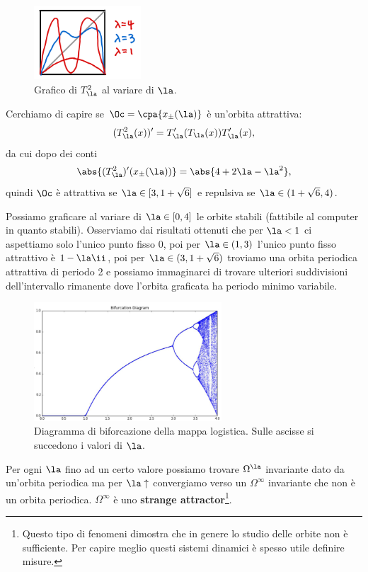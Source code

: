 \begin{figure}[!htb]
    \centering
    \includegraphics[width=4cm]{Immagini/Seconda_iterata_Logistica.png}
    \caption{Grafico di $T^2_\la$ al variare di $\la$.}
    \label{LogisticaIterata}
\end{figure}

\noindent
Cerchiamo di capire se $\Oc=\cpa{x_{\pm}(\la)}$ \`e un'orbita attrattiva:
\[(T_\la^2(x))'=T_\la'(T_\la(x))T'_\la(x),\]
da cui dopo dei conti
\[\abs{(T^2_\la)'(x_{\pm}(\la))}=\abs{4+2\la-\la^2},\]
quindi $\Oc$ \`e attrattiva se $\la\in [3,1+\sqrt 6]$ e repulsiva se $\la\in (1+\sqrt 6,4)$.
\vspace{0.25cm}

\noindent Possiamo graficare al variare di $\la\in [0,4]$ le orbite stabili (fattibile al computer in quanto stabili). 
Osserviamo dai risultati ottenuti che per $\la<1$ ci aspettiamo solo l'unico punto fisso $0$, poi per $\la\in(1,3)$ l'unico punto fisso attrattivo \`e $1-\la\ii$, poi per $\la\in (3,1+\sqrt 6)$ troviamo una orbita periodica attrattiva di periodo 2 e possiamo immaginarci di trovare ulteriori suddivisioni dell'intervallo rimanente dove l'orbita graficata ha periodo minimo variabile.

\begin{figure}[!htb]
    \centering
    \includegraphics[width=7cm]{Immagini/Diagramma_biforcazione_logistica.png}
    \caption{Diagramma di biforcazione della mappa logistica. Sulle ascisse si succedono i valori di $\la$.}
    \label{DiagrammaBiforcazione}
\end{figure}
\noindent
Per ogni $\la$ fino ad un certo valore possiamo trovare $\Omega^\la$ invariante dato da un'orbita periodica ma per $\la\uparrow$ convergiamo verso un $\Omega^\infty$ invariante che non \`e un orbita periodica. $\Omega^\infty$ \`e uno \textbf{strange attractor}\footnote{Questo tipo di fenomeni dimostra che in genere lo studio delle orbite non \`e sufficiente. Per capire meglio questi sistemi dinamici \`e spesso utile definire misure.}.



